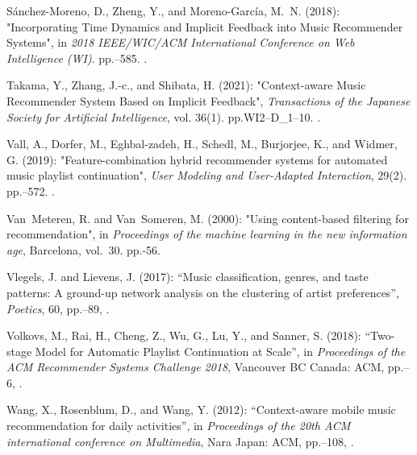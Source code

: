 \documentclass[11pt,titlepage,oneside]{book}
\begin{document}
\begin{thebibliography}{97}
	Sánchez-Moreno, D., Zheng, Y., and Moreno-García, M.~N. (2018):
	"Incorporating {Time} {Dynamics} and {Implicit} {Feedback} into
		{Music} {Recommender} {Systems}", in \textit{2018 {IEEE}/{WIC}/{ACM}
		{International} {Conference} on {Web} {Intelligence} ({WI})}.
	pp.--585. .
	
	Takama, Y., Zhang, J.-c., and Shibata, H. (2021): "Context-aware
		{Music} {Recommender} {System} {Based} on {Implicit} {Feedback}",
	\textit{Transactions of the Japanese Society for Artificial Intelligence},
	vol. 36(1). pp.\ignorespaces WI2--D\_1--10. .
	
	Vall, A., Dorfer, M., Eghbal-zadeh, H., Schedl, M., Burjorjee, K., and Widmer,
	G. (2019): "Feature-combination hybrid recommender systems for
		automated music playlist continuation", \textit{User Modeling and
		User-Adapted Interaction}, 29(2). pp.--572.
	.
	
	Van~Meteren, R. and Van~Someren, M. (2000): "Using content-based
		filtering for recommendation", in \textit{Proceedings of the machine learning in the new information age}, Barcelona, vol.~30. pp.-56.
	
	Vlegels, J. and Lievens, J. (2017): \enquote{Music classification, genres, and
		taste patterns: {A} ground-up network analysis on the clustering of artist
		preferences}, \textit{Poetics}, 60, pp.--89,
	.
	
	Volkovs, M., Rai, H., Cheng, Z., Wu, G., Lu, Y., and Sanner, S. (2018):
	\enquote{Two-stage {Model} for {Automatic} {Playlist} {Continuation} at
		{Scale}}, in \textit{Proceedings of the {ACM} {Recommender} {Systems}
		{Challenge} 2018}, Vancouver BC Canada: ACM, pp.--6,
	.
	
	Wang, X., Rosenblum, D., and Wang, Y. (2012): \enquote{Context-aware mobile
		music recommendation for daily activities}, in \textit{Proceedings of the
		20th {ACM} international conference on {Multimedia}}, Nara Japan: ACM,
	pp.--108, .
	

\end{thebibliography}
\end{document}

